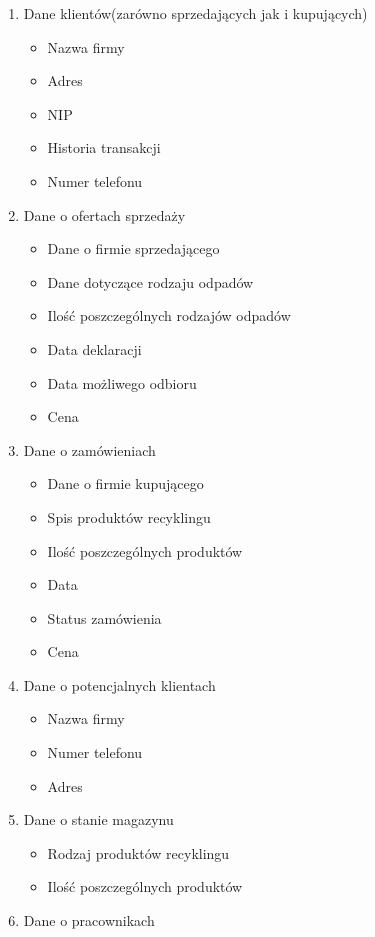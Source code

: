 \begin{enumerate}
	\item Dane klientów(zarówno sprzedających jak i kupujących)
	\begin{itemize}
		\item Nazwa firmy
		\item Adres
		\item NIP
		\item Historia transakcji
		\item Numer telefonu
	\end{itemize}
	\item Dane o ofertach sprzedaży
	\begin{itemize}
		\item Dane o firmie sprzedającego
		\item Dane dotyczące rodzaju odpadów
		\item Ilość poszczególnych rodzajów odpadów
		\item Data deklaracji
		\item Data możliwego odbioru
		\item Cena
	\end{itemize}
	\item Dane o zamówieniach
	\begin{itemize}
		\item Dane o firmie kupującego
		\item Spis produktów recyklingu
		\item Ilość poszczególnych produktów
		\item Data
		\item Status zamówienia
		\item Cena
	\end{itemize}
	\item Dane o potencjalnych klientach
	\begin{itemize}
		\item Nazwa firmy
		\item Numer telefonu
		\item Adres
	\end{itemize}
	\item Dane o stanie magazynu
	\begin{itemize}
		\item Rodzaj produktów recyklingu
		\item Ilość poszczególnych produktów
	\end{itemize}
	\item Dane o pracownikach
	\begin{itemize}

\end{itemize}
\end{enumerate}
